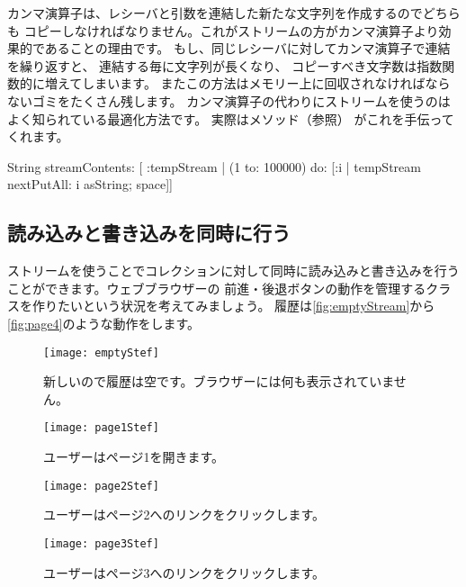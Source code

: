 \documentclass[a4paper,10pt,twoside]{book}
\begin{document}
カンマ演算子は、レシーバと引数を連結した新たな文字列を作成するのでどちらも
コピーしなければなりません。これがストリームの方がカンマ演算子より効果的であることの理由です。
もし、同じレシーバに対してカンマ演算子で連結を繰り返すと、
連結する毎に文字列が長くなり、
コピーすべき文字数は指数関数的に増えてしまいます。
またこの方法はメモリー上に回収されなければならないゴミをたくさん残します。
カンマ演算子の代わりにストリームを使うのはよく知られている最適化方法です。
実際はメソッド（\pageref{sec:streamContents}参照）
がこれを手伝ってくれます。


\begin{code}{}
String streamContents: [ :tempStream |
  (1 to: 100000)
       do: [:i | tempStream nextPutAll: i asString; space]] 
\end{code}

\subsection{読み込みと書き込みを同時に行う}

ストリームを使うことでコレクションに対して同時に読み込みと書き込みを行うことができます。ウェブブラウザーの
前進・後退ボタンの動作を管理するクラスを作りたいという状況を考えてみましょう。
履歴は\ref{fig:emptyStream}から\ref{fig:page4}のような動作をします。


\begin{figure}[!ht]
\centerline{\texttt{[image: emptyStef]}}
\caption{新しいので履歴は空です。ブラウザーには何も表示されていません。}
\vspace{.2in}
\end{figure}

\begin{figure}[!ht]
\centerline{\texttt{[image: page1Stef]}}
\caption{ユーザーはページ1を開きます。}
\vspace{.2in}
\end{figure}

\begin{figure}[!ht]
\centerline{\texttt{[image: page2Stef]}}
\caption{ユーザーはページ2へのリンクをクリックします。}
\vspace{.2in}
\end{figure}

\begin{figure}[!ht]
\centerline{\texttt{[image: page3Stef]}}
\caption{ユーザーはページ3へのリンクをクリックします。}
\vspace{.2in}
\end{figure}
\end{document}
